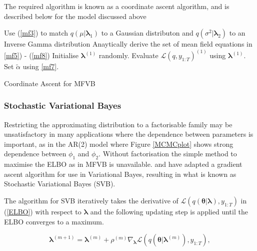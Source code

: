 \documentclass[12pt,a4paper]{article}%
\numberwithin{equation}{section}
\begin{document}
The required algorithm is known as a coordinate ascent algorithm, and is described below for the model discussed above

\vspace{2mm}

\begin{algorithm}[H]
 Use (\ref{mf3}) to match $q(\mu|\boldsymbol{\lambda}_1)$ to a Gaussian distributon and $q(\sigma^2 | \boldsymbol{\lambda}_2)$ to an Inverse Gamma distribution\;
 Anaytically derive the set of mean field equations in \ref{mf5}) - (\ref{mf8})\;
 Initialise $\boldsymbol{\lambda}^{(1)}$ randomly.\;
 Evaluate $\mathcal{L}(q, y_{1:T})^{(1)}$ using $\boldsymbol{\lambda}^{(1)}$.\;
 Set $\tilde{\alpha}$ using \ref{mf7}.\;
 \caption{Coordinate Ascent for MFVB}
  \label{alg:algorithm1}
\end{algorithm}

\subsubsection{Stochastic Variational Bayes}

Restricting the approximating distribution to a factorisable family may be unsatisfactory in many applications where the dependence between parameters is important, as in the AR(2) model where Figure \ref{MCMCplot} shows strong dependence between $\phi_1$ and $\phi_2$. Without factorisation the simple method to maximise the ELBO as in MFVB is unavailable. \citet{Paisley2012} and \citet{Ranganath2014} have adapted a gradient ascent algorithm for use in Variational Bayes, resulting in what is known as Stochastic Variational Bayes (SVB).

The algorithm for SVB iteratively takes the  derivative of $\mathcal{L}(q(\boldsymbol{\theta} | \boldsymbol{\lambda}), y_{1:T})$ in (\ref{ELBO}) with respect to $\boldsymbol{\lambda}$ and the following updating step is applied until the ELBO converges to a maximum.

\begin{equation}
\label{SGA1}
\boldsymbol{\lambda}^{(m+1)} = \boldsymbol{\lambda}^{(m)} + \rho^{(m)} \nabla_{\boldsymbol{\lambda}} \mathcal{L}(q(\boldsymbol{\theta} | \boldsymbol{\lambda}^{(m)}), y_{1:T}),
\end{equation}
\end{document}
